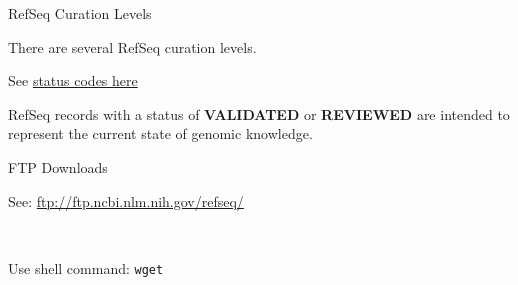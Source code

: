 
\begin{frame}{RefSeq Curation Levels}

There are several RefSeq curation levels.

See
\href{http://www.ncbi.nlm.nih.gov/books/NBK21091/table/ch18.T.refseq_status_codes/?report=objectonly}{status
codes here}

RefSeq records with a status of \textbf{VALIDATED} or \textbf{REVIEWED}
are intended to represent the current state of genomic knowledge.

\end{frame}

\begin{frame}{FTP Downloads}

See: \url{ftp://ftp.ncbi.nlm.nih.gov/refseq/}

~

Use shell command: \texttt{wget}

\end{frame}
